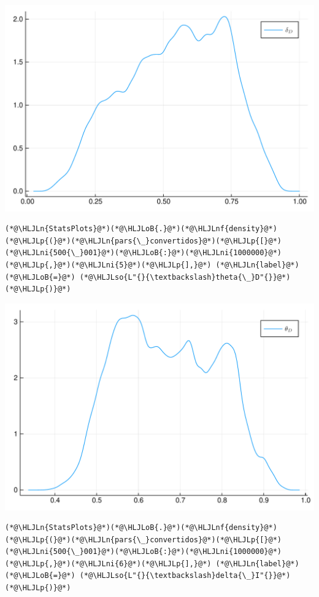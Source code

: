 \documentclass[12pt,a4paper]{article}
\newcommand{\HLJLn}[1]{#1}
\newcommand{\HLJLnf}[1]{\textcolor[RGB]{66,102,213}{#1}}
\newcommand{\HLJLso}[1]{\textcolor[RGB]{201,61,57}{#1}}
\newcommand{\HLJLni}[1]{\textcolor[RGB]{59,151,46}{#1}}
\newcommand{\HLJLoB}[1]{\textcolor[RGB]{102,102,102}{\textbf{#1}}}
\newcommand{\HLJLp}[1]{#1}
\begin{document}
\includegraphics[width=\linewidth]{figures/carlos_mcmc_5_1.pdf}

\begin{lstlisting}
(*@\HLJLn{StatsPlots}@*)(*@\HLJLoB{.}@*)(*@\HLJLnf{density}@*)(*@\HLJLp{(}@*)(*@\HLJLn{pars{\_}convertidos}@*)(*@\HLJLp{[}@*)(*@\HLJLni{500{\_}001}@*)(*@\HLJLoB{:}@*)(*@\HLJLni{1000000}@*)(*@\HLJLp{,}@*)(*@\HLJLni{5}@*)(*@\HLJLp{],}@*) (*@\HLJLn{label}@*)(*@\HLJLoB{=}@*) (*@\HLJLso{L"{}{\textbackslash}theta{\_}D"{}}@*)(*@\HLJLp{)}@*)
\end{lstlisting}

\includegraphics[width=\linewidth]{figures/carlos_mcmc_6_1.pdf}

\begin{lstlisting}
(*@\HLJLn{StatsPlots}@*)(*@\HLJLoB{.}@*)(*@\HLJLnf{density}@*)(*@\HLJLp{(}@*)(*@\HLJLn{pars{\_}convertidos}@*)(*@\HLJLp{[}@*)(*@\HLJLni{500{\_}001}@*)(*@\HLJLoB{:}@*)(*@\HLJLni{1000000}@*)(*@\HLJLp{,}@*)(*@\HLJLni{6}@*)(*@\HLJLp{],}@*) (*@\HLJLn{label}@*)(*@\HLJLoB{=}@*) (*@\HLJLso{L"{}{\textbackslash}delta{\_}I"{}}@*)(*@\HLJLp{)}@*)
\end{lstlisting}
\end{document}
